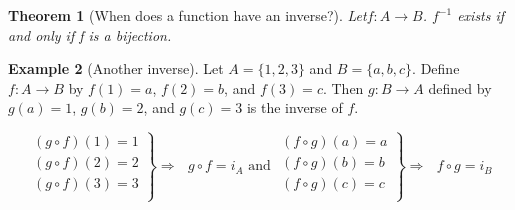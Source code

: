 \documentclass[10pt,]{book}
\theoremstyle{plain}
\newtheorem{theorem}{Theorem}[section]
\theoremstyle{definition}
\theoremstyle{definition}
\newtheorem{example}[theorem]{Example}
\theoremstyle{definition}
\begin{document}
\begin{theorem}[When does a function have an inverse?]\label{theorem-inverse-function-condition}
 Let\(f:A \rightarrow  B\). \(f^{-1}\) exists if and only if f is a bijection.%
\end{theorem}
\begin{example}[Another inverse]\label{example-inverse-another}
Let \(A =\{1,2, 3\}\) and \(B = \{a, b, c\}\). Define \(f:A \rightarrow  B\) by \(f(1) = a\), \(f(2) = b\), and {
}\(f(3) = c\). Then \(g: B \rightarrow  A\) defined by \(g(a) = 1\), \(g(b) = 2\), and \(g(c) = 3\) is the inverse of \(f\).

\[\left.
\begin{array}{c}
 (g\circ f)(1)= 1 \\
 (g\circ f)(2)=2 \\
 (g\circ f)(3)=3 \\
\end{array}
\right\}\Rightarrow \text{  }g\circ f = i_A \textrm{ and } \left.
\begin{array}{c}
 (f\circ g)(a)=a \\
 (f\circ g)(b)=b \\
 (f\circ g)(c)=c \\
\end{array}
\right\}\Rightarrow \text{  }f\circ g = i_B\]%
\end{example}
\typeout{************************************************}
\typeout{************************************************}
\end{document}
